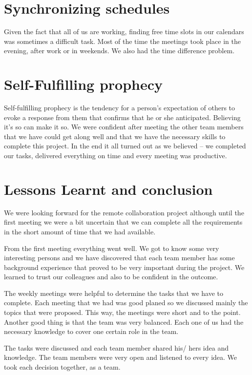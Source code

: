 \section{Synchronizing schedules}
Given the fact that all of us are working, finding free time slots in our calendars was sometimes a difficult task. Most of the time the meetings took place in the evening, after work or in weekends. We also had the time difference problem.

\section{Self-Fulfilling prophecy}
Self-fulfilling prophecy is the tendency for a person’s expectation of others to evoke a response from them that confirms that he or she anticipated. Believing it’s so can make it so. We were confident after meeting the other team members that we have could get along well and that we have the necessary skills to complete this project. In the end it all turned out as we believed – we completed our tasks, delivered everything on time and every meeting was productive.

\section{Lessons Learnt and conclusion}
We were looking forward for the remote collaboration project although until the first meeting we were a bit uncertain that we can complete all the requirements in the short amount of time that we had available.

From the first meeting everything went well. We got to know some very interesting persons and we have discovered that each team member has some background experience that proved to be very important during the project. We learned to trust our colleagues and also to be confident in the outcome.


The weekly meetings were helpful to determine the tasks that we have to complete. Each meeting that we had was good planed so we discussed mainly the topics that were proposed. This way, the meetings were short and to the point.
Another good thing is that the team was very balanced. Each one of us had the necessary knowledge to cover one certain role in the team. 

The tasks were discussed and each team member shared his/ hers idea and knowledge. The team members were very open and listened to every idea. We took each decision together, as a team.

